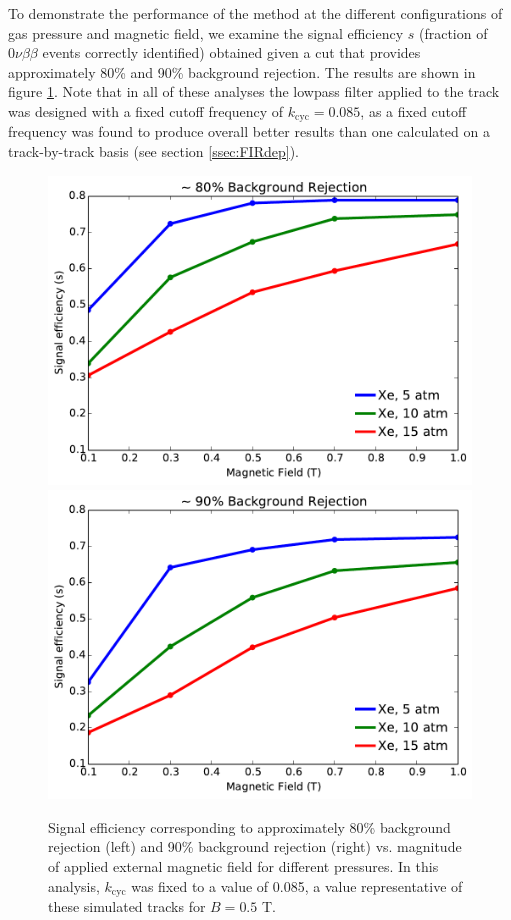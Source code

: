\documentclass{JINST}
\begin{document}
To demonstrate the performance of the method at the different configurations of gas pressure and magnetic 
field, we examine the signal efficiency $s$ (fraction of $0\nu\beta\beta$ events correctly identified) obtained 
given a cut that provides approximately 80\% and 90\% background rejection.  The results are shown in figure 
\ref{fig_config}.  Note that in all of these analyses the lowpass filter applied to the track was designed with
a fixed cutoff frequency of $k_{\mathrm{cyc}} = 0.085$, as a fixed cutoff frequency was found to produce overall
better results than one calculated on a track-by-track basis (see section \ref{ssec:FIRdep}).  

\begin{figure}[!htb]
	\centering
	\includegraphics[scale=0.43]{fig/eff_vs_b_80.pdf}
	\includegraphics[scale=0.43]{fig/eff_vs_b_90.pdf}
	\caption{\label{fig_config}Signal efficiency corresponding to approximately 80\% background rejection (left) and 90\% background rejection (right) vs. magnitude of applied external magnetic field for different pressures.  In this analysis, $k_{\mathrm{cyc}}$ was fixed to a value of 0.085, a value representative of these simulated tracks for $B = 0.5$ T.}  %
\end{figure}
\end{document}
